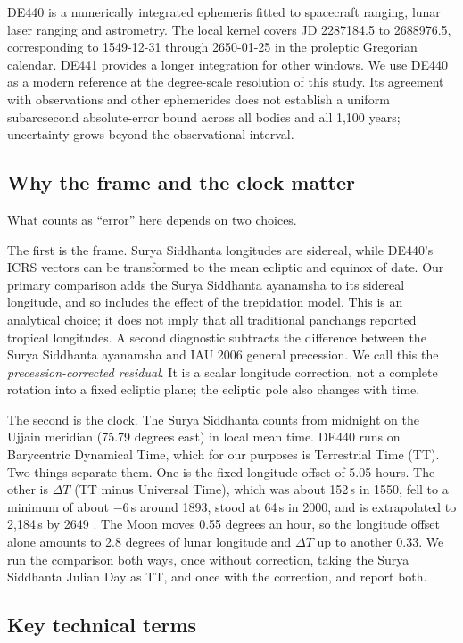 \documentclass[11pt,a4paper]{article}
\newcommand{\dT}{$\Delta T$}
\begin{document}
DE440 \citep{park2021} is a numerically integrated ephemeris fitted to spacecraft ranging, lunar laser ranging and astrometry. The local kernel covers JD 2287184.5 to 2688976.5, corresponding to 1549-12-31 through 2650-01-25 in the proleptic Gregorian calendar. DE441 provides a longer integration for other windows. We use DE440 as a modern reference at the degree-scale resolution of this study. Its agreement with observations and other ephemerides does not establish a uniform subarcsecond absolute-error bound across all bodies and all 1,100 years; uncertainty grows beyond the observational interval.

\subsection{Why the frame and the clock matter}
\label{sec:frame-clock}

What counts as ``error'' here depends on two choices.

The first is the frame. Surya Siddhanta longitudes are sidereal, while DE440's ICRS vectors can be transformed to the mean ecliptic and equinox of date. Our primary comparison adds the Surya Siddhanta ayanamsha to its sidereal longitude, and so includes the effect of the trepidation model. This is an analytical choice; it does not imply that all traditional panchangs reported tropical longitudes. A second diagnostic subtracts the difference between the Surya Siddhanta ayanamsha and IAU 2006 general precession. We call this the \emph{precession-corrected residual}. It is a scalar longitude correction, not a complete rotation into a fixed ecliptic plane; the ecliptic pole also changes with time.

The second is the clock. The Surya Siddhanta counts from midnight on the Ujjain meridian (75.79 degrees east) in local mean time. DE440 runs on Barycentric Dynamical Time, which for our purposes is Terrestrial Time (TT). Two things separate them. One is the fixed longitude offset of 5.05 hours. The other is \dT{} (TT minus Universal Time), which was about 152\,s in 1550, fell to a minimum of about $-6$\,s around 1893, stood at 64\,s in 2000, and is extrapolated to 2,184\,s by 2649 \citep{espenak2006}. The Moon moves 0.55 degrees an hour, so the longitude offset alone amounts to 2.8 degrees of lunar longitude and \dT{} up to another 0.33. We run the comparison both ways, once without correction, taking the Surya Siddhanta Julian Day as TT, and once with the correction, and report both.

\subsection{Key technical terms}
\label{sec:glossary}
\end{document}
